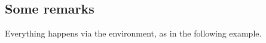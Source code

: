 \documentclass[10pt, a4paper]{article}
\begin{document}

\subsection{Some remarks}

Everything happens via the  environment, as in the following example.

\end{document}
